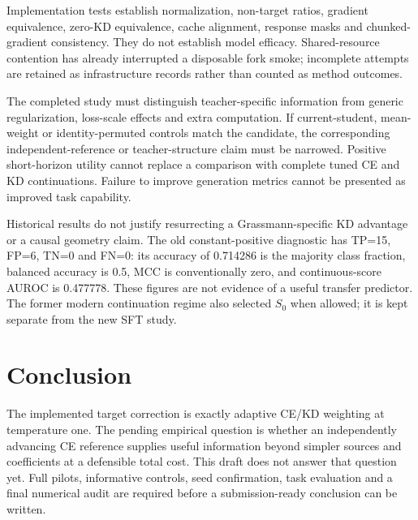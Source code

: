 \documentclass[11pt]{article}
\begin{document}
Implementation tests establish normalization, non-target ratios, gradient
equivalence, zero-KD equivalence, cache alignment, response masks and
chunked-gradient consistency. They do not establish model efficacy.
Shared-resource contention has already interrupted a disposable fork
smoke; incomplete attempts are retained as infrastructure records rather
than counted as method outcomes.

The completed study must distinguish teacher-specific information from
generic regularization, loss-scale effects and extra computation. If
current-student, mean-weight or identity-permuted controls match the
candidate, the corresponding independent-reference or teacher-structure
claim must be narrowed. Positive short-horizon utility cannot replace a
comparison with complete tuned CE and KD continuations. Failure to improve
generation metrics cannot be presented as improved task capability.

Historical results do not justify resurrecting a Grassmann-specific KD
advantage or a causal geometry claim. The old constant-positive diagnostic
has TP=15, FP=6, TN=0 and FN=0: its accuracy of 0.714286 is the majority
class fraction, balanced accuracy is 0.5, MCC is conventionally zero, and
continuous-score AUROC is 0.477778. These figures are not evidence of a
useful transfer predictor. The former modern continuation regime also
selected $S_0$ when allowed; it is kept separate from the new SFT study.

\section{Conclusion}
The implemented target correction is exactly adaptive CE/KD weighting at
temperature one. The pending empirical question is whether an independently
advancing CE reference supplies useful information beyond simpler sources
and coefficients at a defensible total cost. This draft does not answer
that question yet. Full pilots, informative controls, seed confirmation,
task evaluation and a final numerical audit are required before a
submission-ready conclusion can be written.


\end{document}
